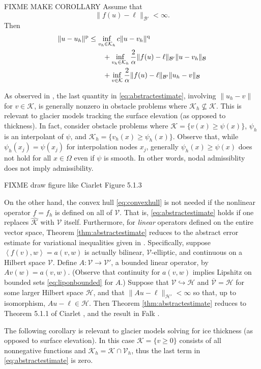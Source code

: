 \documentclass[hidelinks,onefignum,onetabnum,final]{siamart220329}  %
\newcommand{\cB}{\mathcal{B}}
\newcommand{\cH}{\mathcal{H}}
\newcommand{\cK}{\mathcal{K}}
\newcommand{\cV}{\mathcal{V}}
\newcommand{\hcK}{\widehat{\cK}}
\newcommand{\pp}{{\text{\textnormal{p}}}}
\newcommand{\qq}{{\text{\textnormal{q}}}}
\newcommand{\ip}[2]{\left<#1,#2\right>}
\begin{document}
FIXME MAKE COROLLARY Assume that
\begin{equation}
\|f(u)-\ell\|_{\cB'} < \infty.  \label{eq:fellboundedB}
\end{equation}
Then
\begin{align}
\|u-u_h\|^\pp &\le \inf_{v_h\in\cK_h} c \|u - v_h\|^\qq  \label{eq:NORMabstractestimate} \\
   &\qquad + \inf_{v_h\in\cK_h} \frac{2}{\alpha} \|f(u)-\ell\|_{\cB'} \|u-v_h\|_{\cB} \notag \\
   &\qquad + \inf_{v\in\cK} \frac{2}{\alpha} \|f(u)-\ell\|_{\cB'} \|u_h-v\|_{\cB} \notag
\end{align}

As observed in \cite{Ciarlet2002}, the last quantity in \eqref{eq:abstractestimate}, involving $\|u_h-v\|$ for $v\in\cK$, is generally nonzero in obstacle problems where $\cK_h \nsubseteq \cK$.  This is relevant to glacier models tracking the surface elevation (as opposed to thickness).  In fact, consider obstacle problems where $\cK=\{v(x)\ge \psi(x)\}$, $\psi_h$ is an interpolant of $\psi$, and $\cK_h=\{v_h(x)\ge \psi_h(x)\}$.  Observe that, while $\psi_h(x_j)=\psi(x_j)$ for interpolation nodes $x_j$, generally $\psi_h(x) \ge \psi(x)$ does not hold for all $x\in\Omega$ even if $\psi$ is smooth.  In other words, nodal admissiblity does not imply admissibility.

FIXME draw figure like Ciarlet Figure 5.1.3

On the other hand, the convex hull \eqref{eq:convexhull} is not needed if the nonlinear operator $f=f_h$ is defined on all of $\cV$.  That is, \eqref{eq:abstractestimate} holds if one replaces $\hcK$ with $\cV$ itself.  Furthermore, for \emph{linear} operators defined on the entire vector space, Theorem \ref{thm:abstractestimate} reduces to the abstract error estimate for variational inequalities given in \cite{Falk1974}.  Specifically, suppose $\ip{f(v)}{w}=a(v,w)$ is actually bilinear, $\cV$-elliptic, and continuous on a Hilbert space $\cV$.  Define $A:\cV\to\cV'$, a bounded linear operator, by $Av(w) = a(v,w)$. (Observe that continuity for $a(v,w)$ implies Lipshitz on bounded sets \eqref{eq:liponbounded} for $A$.)  Suppose that $\cV\hookrightarrow \cH$ and $\overline{\cV} = \cH$ for some larger Hilbert space $\cH$, and that $\|Au-\ell\|_{\cH'} < \infty$ so that, up to isomorphism, $Au-\ell \in\cH$.  Then Theorem \ref{thm:abstractestimate} reduces to Theorem 5.1.1 of Ciarlet \cite{Ciarlet2002}, and the result in Falk \cite{Falk1974}.

The following corollary is relevant to glacier models solving for ice thickness (as opposed to surface elevation).  In this case $\cK = \{v\ge 0\}$ consists of all nonnegative functions and $\cK_h=\cK\cap\cV_h$, thus the last term in \eqref{eq:abstractestimate} is zero.
\end{document}
